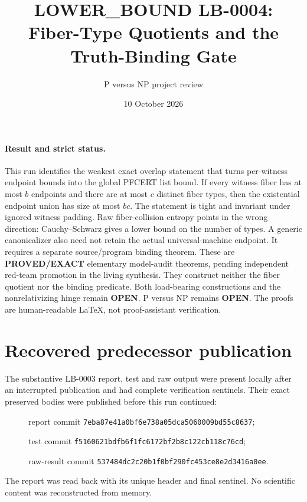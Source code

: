 \documentclass[11pt]{article}
\title{LOWER\_BOUND LB-0004:\\Fiber-Type Quotients and the Truth-Binding Gate}
\author{P versus NP project review}
\date{10 October 2026}
\begin{document}
\maketitle

\paragraph{Result and strict status.}
This run identifies the weakest exact overlap statement that turns
per-witness endpoint bounds into the global PFCERT list bound.  If every
witness fiber has at most $b$ endpoints and there are at most $c$ distinct
fiber types, then the existential endpoint union has size at most $bc$.
The statement is tight and invariant under ignored witness padding.  Raw
fiber-collision entropy points in the wrong direction: Cauchy--Schwarz gives
a lower bound on the number of types.  A generic canonicalizer also need not
retain the actual universal-machine endpoint.  It requires a separate
source/program binding theorem.  These are \textbf{PROVED/EXACT} elementary
model-audit theorems, pending independent red-team promotion in the living
synthesis.  They construct neither the fiber quotient nor the binding
predicate.  Both load-bearing constructions and the nonrelativizing hinge
remain \textbf{OPEN}.  P versus NP remains \textbf{OPEN}.  The proofs are
human-readable LaTeX, not proof-assistant verification.

\section{Recovered predecessor publication}
The substantive LB-0003 report, test and raw output were present locally
after an interrupted publication and had complete verification sentinels.
Their exact preserved bodies were published before this run continued:
\begin{description}
\item[] report commit \texttt{7eba87e41a0bf6e738a05dca5060009bd55c8637};
\item[] test commit \texttt{f5160621bdfb6f1fc6172bf2b8c122cb118c76cd};
\item[] raw-result commit \texttt{537484dc2c20b1f0bf290fc453ce8e2d3416a0ee}.
\end{description}
The report was read back with its unique header and final sentinel.  No
scientific content was reconstructed from memory.
\end{document}
